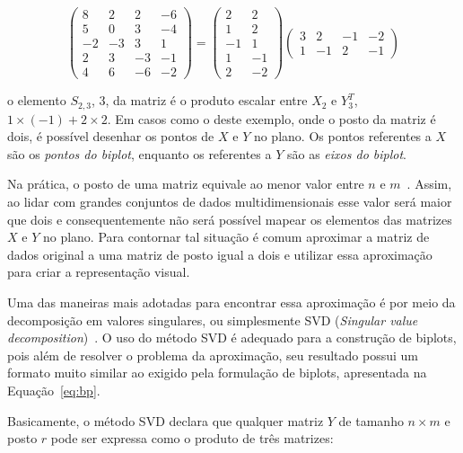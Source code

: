 \begin{equation}
    \left( \begin{array}{rrrr}
        8 &  2 &  2 & -6 \\
        5 &  0 &  3 & -4 \\
       -2 & -3 &  3 &  1 \\
            2 &  3 & -3 & -1 \\
        4 &  6 & -6 & -2\end{array}
\right) = \left( \begin{array}{rr}
         2 & 2 \\
         1 & 2 \\
        -1 & 1 \\
         1 & -1 \\
         2 & -2\end{array} 
\right) \left( \begin{array}{rrrr}
        3 &  2 &-1 & -2 \\
    1 & -1 & 2 & -1 \end{array} 
\right)
\end{equation}

o elemento $S_{2,3}$, 3, da matriz é o
produto escalar entre $X_2$ e $Y^T_3$, $1 \times \left( -1
\right) + 2 \times 2$. Em casos como o deste
exemplo, onde o posto da matriz é dois, é possível desenhar os
pontos de $X$ e $Y$ no plano. Os pontos referentes a $X$ são
os \emph{pontos do biplot}, enquanto os referentes a $Y$ são
as \emph{eixos do biplot}.

Na prática, o posto de uma matriz equivale ao menor valor
entre $n$ e $m$~\cite{Greenacre2010}. Assim, ao lidar com
grandes conjuntos de dados multidimensionais esse valor será
maior que dois e consequentemente não será possível mapear
os elementos das matrizes $X$ e $Y$ no plano. Para contornar
tal situação é comum aproximar a matriz de dados original a
uma matriz de posto igual a dois e utilizar essa aproximação
para criar a representação visual.

Uma das maneiras mais adotadas para encontrar essa
aproximação é por meio da decomposição em valores
singulares, ou simplesmente SVD (\emph{Singular value
decomposition})~\cite{Kalman1996}. O uso do método SVD é
adequado para a construção de biplots, pois além de
resolver o problema da aproximação, seu resultado possui
um formato muito similar ao exigido pela formulação de biplots,
apresentada na Equação~\ref{eq:bp}.

Basicamente, o método SVD declara que qualquer matriz $Y$
de tamanho $n \times m$ e posto $r$ pode ser expressa como o
produto de três matrizes:

